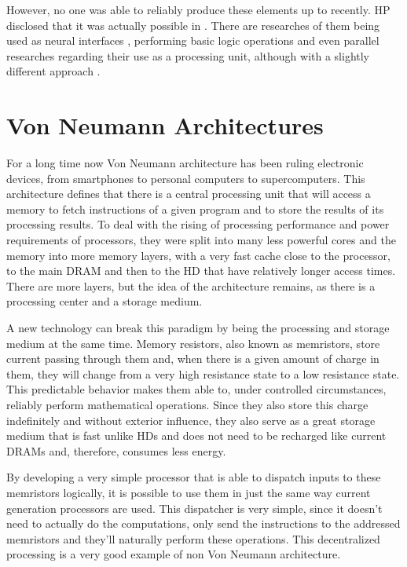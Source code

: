 \documentclass[ecp,tc,english]{iiufrgs}
\begin{document}
However, no one was able to reliably produce these elements up to recently. HP disclosed that it was actually possible in \cite{missingmr08}. There are researches of them being used as neural interfaces \cite{mrcrossbar11}, performing basic logic operations \cite{mrstatefullogic10} and even parallel researches regarding their use as a processing unit, although with a slightly different approach \cite{metastateswitches14}.

\chapter{Von Neumann Architectures}

For a long time now Von Neumann architecture has been ruling electronic devices, from smartphones to personal computers to supercomputers. This architecture defines that there is a central processing unit that will access a memory to fetch instructions of a given program and to store the results of its processing results. To deal with the rising of processing performance and power requirements of processors, they were split into many less powerful cores and the memory into more memory layers, with a very fast cache close to the processor, to the main DRAM and then to the HD that have relatively longer access times. There are more layers, but the idea of the architecture remains, as there is a processing center and a storage medium.

A new technology can break this paradigm by being the processing and storage medium at the same time. Memory resistors, also known as memristors, store current passing through them and, when there is a given amount of charge in them, they will change from a very high resistance state to a low resistance state. This predictable behavior makes them able to, under controlled circumstances, reliably perform mathematical operations. Since they also store this charge indefinitely and without exterior influence, they also serve as a great storage medium that is fast unlike HDs and does not need to be recharged like current DRAMs and, therefore, consumes less energy.

By developing a very simple processor that is able to dispatch inputs to these memristors logically, it is possible to use them in just the same way current generation processors are used. This dispatcher is very simple, since it doesn't need to actually do the computations, only send the instructions to the addressed memristors and they'll naturally perform these operations. This decentralized processing is a very good example of non Von Neumann architecture.
\end{document}
